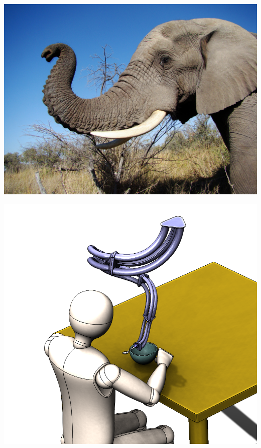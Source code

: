 \documentclass[25pt, a0paper, portrait]{tikzposter}
\begin{document}
{\begin{minipage}[t]{0.45\linewidth}
    \end{minipage} %
    \hspace{25pt}
    \begin{minipage}[t]{0.16\linewidth}
        \centering
        \begin{tikzfigure}
            \includegraphics[width=\linewidth, height=0.09\textheight]{images/elephant.jpg}
        \end{tikzfigure}
    \end{minipage} %
    \begin{minipage}[t]{0.16\linewidth}
        \centering
        \begin{tikzfigure}
            \includegraphics[width=\linewidth, height=0.09\textheight]{images/Application2.png}

\end{tikzfigure}
\end{minipage}}
\end{document}
